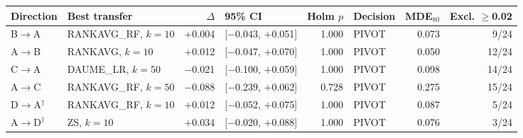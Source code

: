 \begin{tabular}{llrlrlrr}
\hline
Direction & Best transfer & $\Delta$ & 95\% CI & Holm $p$ & Decision & MDE$_{80}$ & \shortstack{Excl.\\$\ge$0.02} \\
\hline
B$\to$A & RANKAVG\_RF, $k=10$ & $+$0.004 & [$-$0.043, $+$0.051] & 1.000 & PIVOT & 0.073 & 9/24 \\
A$\to$B & RANKAVG, $k=10$ & $+$0.012 & [$-$0.047, $+$0.070] & 1.000 & PIVOT & 0.050 & 12/24 \\
C$\to$A & DAUME\_LR, $k=50$ & $-$0.021 & [$-$0.100, $+$0.059] & 1.000 & PIVOT & 0.098 & 14/24 \\
A$\to$C & RANKAVG\_RF, $k=50$ & $-$0.088 & [$-$0.239, $+$0.062] & 0.728 & PIVOT & 0.275 & 15/24 \\
D$\to$A$^{\dagger}$ & RANKAVG\_RF, $k=10$ & $+$0.012 & [$-$0.052, $+$0.075] & 1.000 & PIVOT & 0.087 & 5/24 \\
A$\to$D$^{\dagger}$ & ZS, $k=10$ & $+$0.034 & [$-$0.020, $+$0.088] & 1.000 & PIVOT & 0.076 & 3/24 \\
\hline
\end{tabular}
